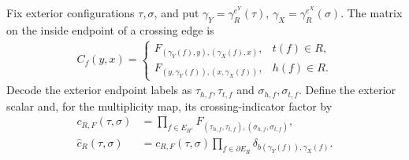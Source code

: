 \begin{definition}%
    \label{def:peps_parent_support_exterior_factors}
    \leanok
    Fix exterior configurations $\tau,\sigma$, and put
    $\gamma_Y=\gamma_R^{e^Y}(\tau)$,
    $\gamma_X=\gamma_R^{e^X}(\sigma)$.
    The matrix on the inside endpoint of a crossing edge is
    \begin{align}
        C_f(y,x)=
        \begin{cases}
            F_{(\gamma_Y(f),y),(\gamma_X(f),x)}, & t(f)\in R, \\
            F_{(y,\gamma_Y(f)),(x,\gamma_X(f))}, & h(f)\in R.
        \end{cases}
        \label{eq:peps_parent_support_crossing_matrix}
    \end{align}
    Decode the exterior endpoint labels as $\tau_{h,f},\tau_{t,f}$
    and $\sigma_{h,f},\sigma_{t,f}$. Define the exterior scalar and,
    for the multiplicity map, its crossing-indicator factor by
    \begin{align}
        c_{R,F}(\tau,\sigma)      & =\prod_{f\in E_{R^c}}
        F_{(\tau_{h,f},\tau_{t,f}),(\sigma_{h,f},\sigma_{t,f})}, \\
        \widehat c_R(\tau,\sigma) & =c_{R,F}(\tau,\sigma)
        \prod_{f\in\partial E_R}\delta_{b(\gamma_Y(f)),\gamma_X(f)}.
    \end{align}
\end{definition}

